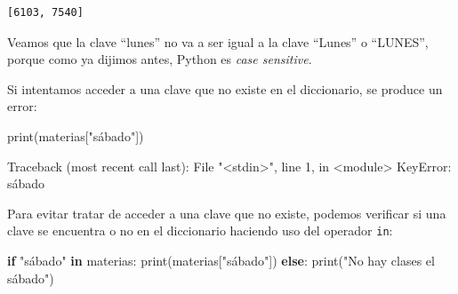 \documentclass[
  letterpaper,
  DIV=11,
  numbers=noendperiod]{scrreprt}
\newenvironment{Shaded}{\begin{snugshade}}{\end{snugshade}}
\newcommand{\BuiltInTok}[1]{\textcolor[rgb]{0.00,0.23,0.31}{#1}}
\newcommand{\ControlFlowTok}[1]{\textcolor[rgb]{0.00,0.23,0.31}{\textbf{#1}}}
\newcommand{\KeywordTok}[1]{\textcolor[rgb]{0.00,0.23,0.31}{\textbf{#1}}}
\newcommand{\NormalTok}[1]{\textcolor[rgb]{0.00,0.23,0.31}{#1}}
\newcommand{\StringTok}[1]{\textcolor[rgb]{0.13,0.47,0.30}{#1}}
\begin{document}
\begin{verbatim}
[6103, 7540]
\end{verbatim}

Veamos que la clave ``lunes'' no va a ser igual a la clave ``Lunes'' o
``LUNES'', porque como ya dijimos antes, Python es \emph{case
sensitive}.

\begin{tcolorbox}[enhanced jigsaw, opacitybacktitle=0.6, toptitle=1mm, toprule=.15mm, arc=.35mm, breakable, bottomrule=.15mm, opacityback=0, leftrule=.75mm, rightrule=.15mm, title=\textcolor{quarto-callout-warning-color}{\faExclamationTriangle}\hspace{0.5em}{¡Cuidado! Acceso a Claves que no Existen}, left=2mm, bottomtitle=1mm, colframe=quarto-callout-warning-color-frame, colback=white, titlerule=0mm, coltitle=black, colbacktitle=quarto-callout-warning-color!10!white]

Si intentamos acceder a una clave que no existe en el diccionario, se
produce un error:

\begin{Shaded}
\begin{Highlighting}[]
\BuiltInTok{print}\NormalTok{(materias[}\StringTok{"sábado"}\NormalTok{])}
\end{Highlighting}
\end{Shaded}

\begin{Shaded}
\begin{Highlighting}[]
\NormalTok{Traceback (most recent call last):}
\NormalTok{File "\textless{}stdin\textgreater{}", line 1, in \textless{}module\textgreater{}}
\NormalTok{KeyError: \textquotesingle{}sábado\textquotesingle{}}
\end{Highlighting}
\end{Shaded}

\end{tcolorbox}

\hfill\break
Para evitar tratar de acceder a una clave que no existe, podemos
verificar si una clave se encuentra o no en el diccionario haciendo uso
del operador \texttt{in}:

\begin{Shaded}
\begin{Highlighting}[]
\ControlFlowTok{if} \StringTok{"sábado"} \KeywordTok{in}\NormalTok{ materias:}
    \BuiltInTok{print}\NormalTok{(materias[}\StringTok{"sábado"}\NormalTok{])}
\ControlFlowTok{else}\NormalTok{:}
    \BuiltInTok{print}\NormalTok{(}\StringTok{"No hay clases el sábado"}\NormalTok{)}
\end{Highlighting}
\end{Shaded}
\end{document}
